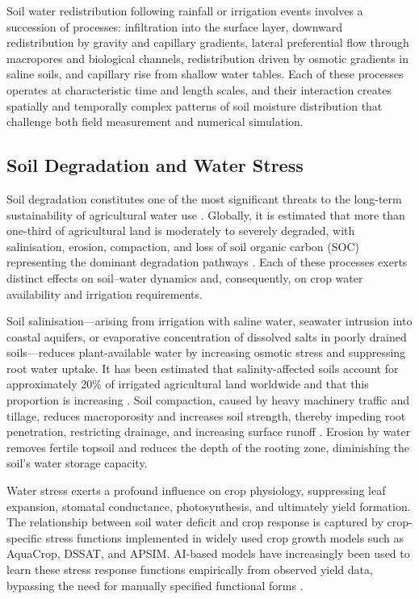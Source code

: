 \documentclass[land,article,submit,pdftex,moreauthors]{Definitions/mdpi}
\numberwithin{equation}{section}
\begin{document}
Soil water redistribution following rainfall or irrigation events involves a succession of processes: infiltration into the surface layer, downward redistribution by gravity and capillary gradients, lateral preferential flow through macropores and biological channels, redistribution driven by osmotic gradients in saline soils, and capillary rise from shallow water tables. Each of these processes operates at characteristic time and length scales, and their interaction creates spatially and temporally complex patterns of soil moisture distribution that challenge both field measurement and numerical simulation.

\subsection{Soil Degradation and Water Stress}

Soil degradation constitutes one of the most significant threats to the long-term sustainability of agricultural water use \cite{Safriel2007}. Globally, it is estimated that more than one-third of agricultural land is moderately to severely degraded, with salinisation, erosion, compaction, and loss of soil organic carbon (SOC) representing the dominant degradation pathways \citep{oldeman1992global}. Each of these processes exerts distinct effects on soil--water dynamics and, consequently, on crop water availability and irrigation requirements.

Soil salinisation---arising from irrigation with saline water, seawater intrusion into coastal aquifers, or evaporative concentration of dissolved salts in poorly drained soils---reduces plant-available water by increasing osmotic stress and suppressing root water uptake. It has been estimated that salinity-affected soils account for approximately 20\% of irrigated agricultural land worldwide and that this proportion is increasing \citep{nachshon2018cropland}. Soil compaction, caused by heavy machinery traffic and tillage, reduces macroporosity and increases soil strength, thereby impeding root penetration, restricting drainage, and increasing surface runoff \citep{Lemenkova202222}. Erosion by water removes fertile topsoil and reduces the depth of the rooting zone, diminishing the soil's water storage capacity.

Water stress exerts a profound influence on crop physiology, suppressing leaf expansion, stomatal conductance, photosynthesis, and ultimately yield formation. The relationship between soil water deficit and crop response is captured by crop-specific stress functions implemented in widely used crop growth models such as AquaCrop, DSSAT, and APSIM. AI-based models have increasingly been used to learn these stress response functions empirically from observed yield data, bypassing the need for manually specified functional forms \citep{van2019machine}.
\end{document}
